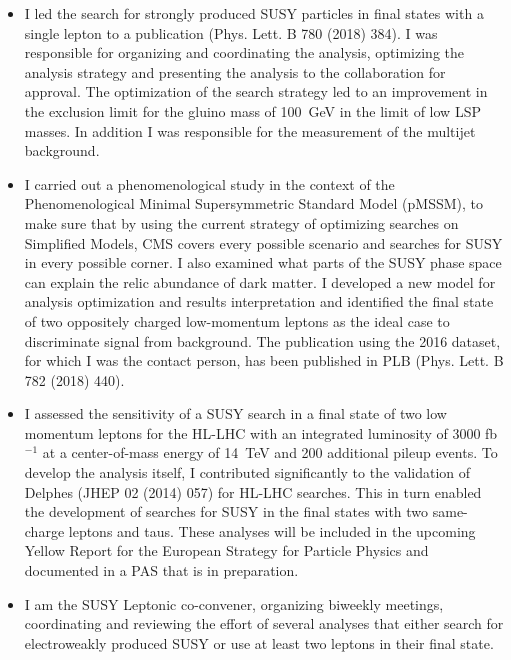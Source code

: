 \documentclass[]{cv} %
\begin{document}
\begin{resume}
\begin{itemize}
  \item I led the search for strongly produced SUSY particles in final states
        with a single lepton to a publication (Phys. Lett. B 780 (2018) 384).
        I was responsible for organizing and coordinating the analysis,
        optimizing the analysis strategy and presenting the analysis to the
        collaboration for approval. The optimization of the search strategy led
        to an improvement in the exclusion limit for the gluino mass of 100~GeV
        in the limit of low LSP masses. In addition I was responsible for the
        measurement of the multijet background.
  \item I carried out a phenomenological study in the context of the
        Phenomenological Minimal Supersymmetric Standard Model (pMSSM), to make sure
        that by using the current strategy of optimizing searches on Simplified
        Models, CMS covers every possible scenario and searches for SUSY in every
        possible corner. I also examined what parts of the SUSY phase space can
        explain the relic abundance of dark matter. I developed a new model for
        analysis optimization and results interpretation and identified the
        final state of two oppositely charged low-momentum leptons as the ideal
        case to discriminate signal from background. The publication using the
        2016 dataset, for which I was the contact person, has been published in
        PLB (Phys. Lett. B 782 (2018) 440).
  \item I assessed the sensitivity of a SUSY search in a final state of two low
        momentum leptons for the HL-LHC with an integrated luminosity of 3000
        fb$^{-1}$ at a center-of-mass energy of 14~TeV and 200 additional pileup
        events. To develop the analysis itself, I contributed significantly to
        the validation of Delphes (JHEP 02 (2014) 057) for HL-LHC searches. This
        in turn enabled the development of searches for SUSY in the final states
        with two same-charge leptons and taus. These analyses will be included
        in the upcoming Yellow Report for the European Strategy for Particle
        Physics and documented in a PAS that is in preparation.
  \item I am the SUSY Leptonic co-convener, organizing biweekly meetings,
        coordinating and reviewing the effort of several analyses that either
        search for electroweakly produced SUSY or use at least two leptons in
        their final state.
\end{itemize}


\end{resume}
\end{document}
